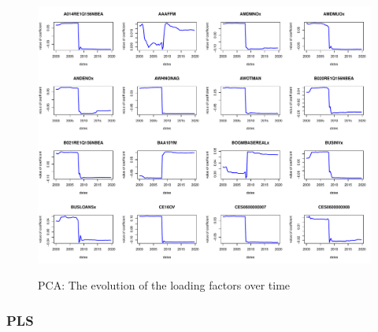 \documentclass{article}
\begin{document}
\begin{subfigures}
\begin{figure}[hbt!]
\includegraphics[page = 13, width=\textwidth]{plots/pca_loads}
\label{fig:pca_loads}
\caption{\label{thirteenth}PCA: The evolution of the loading factors over time}
\centering
\end{figure}

\end{subfigures}

\clearpage

\clearpage
\subsubsection{PLS}
\end{document}
